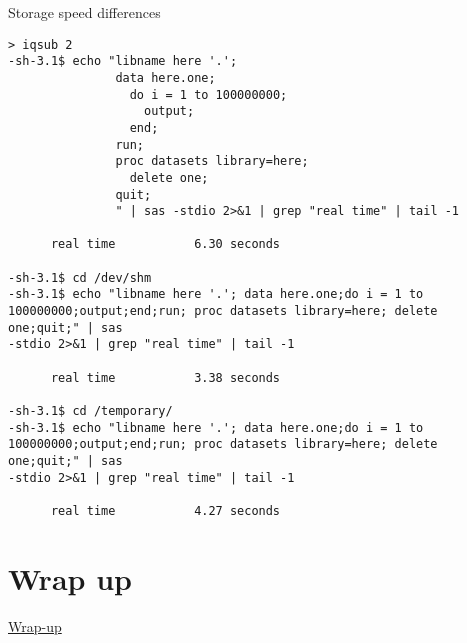 \documentclass[xcolor=table,compress]{beamer}
\begin{document}
\begin{frame}[fragile]{Storage speed differences}
\begin{lstlisting}[language=SAS]
> iqsub 2
-sh-3.1$ echo "libname here '.'; 
               data here.one;
                 do i = 1 to 100000000;
                   output;
                 end;
               run; 
               proc datasets library=here; 
                 delete one;
               quit;
               " | sas -stdio 2>&1 | grep "real time" | tail -1

      real time           6.30 seconds

-sh-3.1$ cd /dev/shm
-sh-3.1$ echo "libname here '.'; data here.one;do i = 1 to 
100000000;output;end;run; proc datasets library=here; delete one;quit;" | sas 
-stdio 2>&1 | grep "real time" | tail -1

      real time           3.38 seconds

-sh-3.1$ cd /temporary/
-sh-3.1$ echo "libname here '.'; data here.one;do i = 1 to 
100000000;output;end;run; proc datasets library=here; delete one;quit;" | sas 
-stdio 2>&1 | grep "real time" | tail -1

      real time           4.27 seconds
\end{lstlisting}
\end{frame}

\section{Wrap up}

\begin{frame}
\href{day3-4.pdf}{Wrap-up}
\end{frame}
\end{document}
